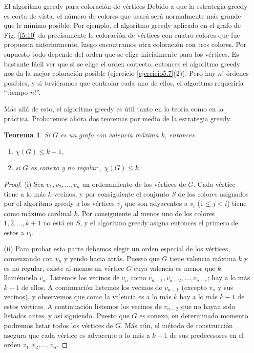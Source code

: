 \documentclass[11pt,spanish,makeidx]{amsbook}
\newtheorem{teorema}{Teorema}[section]
\theoremstyle{definition}
\theoremstyle{remark}
\begin{document}
\begin{section}{El algoritmo greedy para coloración de vértices}
Debido a que la estrategia greedy es corta de vista, el número de colores que usará será normalmente más grande que le mínimo posible. Por ejemplo, el algoritmo greedy aplicado en el grafo de Fig. \ref{f5.10} da precisamente le coloración de vértices con cuatro colores que fue propuesta anteriormente, luego encontramos otra coloración con tres colores. Por supuesto todo depende del orden que se elige inicialmente para los vértices. Es bastante fácil ver que si se elige el orden correcto, entonces el algoritmo greedy nos da la mejor coloración posible (ejercicio \ref{ejercicio5.7}(2)). Pero hay $n!$ órdenes posibles, y si tuviéramos que controlar cada uno de ellos, el algoritmo requeriría ``tiempo $n!$''.

Más allá de esto, el algoritmo greedy es útil tanto en la teoría como en la práctica. Probaremos ahora dos teoremas por medio de la estrategia greedy.

\begin{teorema}\label{t5.7.1} Si $G$ es un grafo con valencia máxima $k$, entonces
\begin{enumerate}
\item[(i)] $\chi(G)\le k+1$,
\item[(ii)] si $G$ es conexo y no regular , $\chi(G) \le k$.
\end{enumerate}
\end{teorema}
\begin{proof} (i) Sea $v_1,v_2,\ldots,v_n$ un ordenamiento de los vértices de $G$. Cada vértice tiene a lo más $k$ vecinos, y por consiguiente el conjunto $S$ de los colores asignados por el algoritmo greedy a los vértices $v_j$ que son adyacentes a $v_i$ ($1\le j <i$) tiene como máximo cardinal $k$. Por consiguiente al menos uno de los colores $1,2,\dots,k+1$ no está en $S$, y el algoritmo greedy asigna entonces el primero de estos a $v_i$.

(ii) Para probar esta parte debemos elegir un orden especial de los vértices, comenzando con $v_n$ y yendo hacia atrás. Puesto que $G$ tiene valencia máxima $k$ y es no regular, existe al menos un vértice $G$ cuya valencia es menor que $k$: llamémoslo $v_n$. Listemos los vecinos de $v_n$ como $v_{n-1},v_{n-2},\ldots,v_{n-r}$; hay a lo más $k-1$ de ellos. A continuación listemos los vecinos de $v_{n-1}$ (excepto $v_n$ y sus vecinos), y observemos que como la valencia es a lo más $k$ hay a lo más $k-1$ de estos vértices. A continuación listemos los vecinos de $v_{n-2}$ que no hayan sido listados antes, y así siguiendo. Puesto que $G$ es conexo, en determinado momento podremos listar todos los vértices de $G$. Más aún, el método de construcción asegura que cada vértice es adyacente a lo más a $k-1$ de sus predecesores en el orden $v_1,v_2,\ldots,v_n$.


\end{proof}
\end{section}
\end{document}
